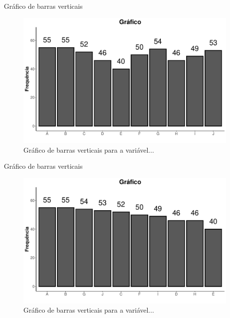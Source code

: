 \documentclass[
  ignorenonframetext,
  serif,
  professionalfont,
  usenames,
  dvipsnames,
  aspectratio = 169]{beamer}
\begin{document}
\begin{frame}{Gráfico de barras verticais}
\protect\hypertarget{gruxe1fico-de-barras-verticais}{}
\begin{figure}

{\centering \includegraphics[width=11cm]{200-exploratoria-uni-tabelas-graficos_files/figure-beamer/unnamed-chunk-11-1} 

}

\caption{Gráfico de barras verticais para a variável...}\label{fig:unnamed-chunk-11}
\end{figure}
\end{frame}

\begin{frame}{Gráfico de barras verticais}
\protect\hypertarget{gruxe1fico-de-barras-verticais-1}{}
\begin{figure}

{\centering \includegraphics[width=11cm]{200-exploratoria-uni-tabelas-graficos_files/figure-beamer/unnamed-chunk-12-1} 

}

\caption{Gráfico de barras verticais para a variável...}\label{fig:unnamed-chunk-12}
\end{figure}
\end{frame}
\end{document}
